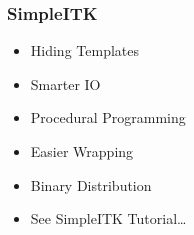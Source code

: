 

{
\begin{frame}
\frametitle{SimpleITK}
\Huge
\begin{itemize}
\item Hiding Templates
\pause
\item Smarter IO
\pause
\item Procedural Programming
\pause
\item Easier Wrapping
\pause
\item Binary Distribution
\pause
\item See SimpleITK Tutorial\dots
\end{itemize}
\end{frame}
}


